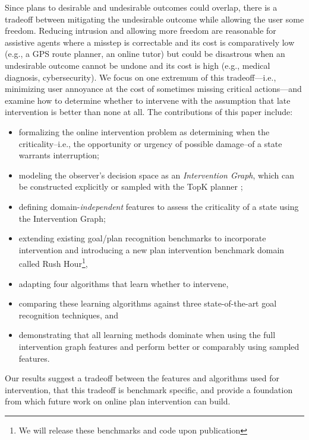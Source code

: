 \documentclass[letterpaper]{article}
\theoremstyle{plain}
\begin{document}
Since plans to desirable and undesirable outcomes could overlap, there is a tradeoff between mitigating the undesirable outcome while allowing the user some freedom.  
Reducing intrusion and allowing more freedom are reasonable for assistive agents where a misstep is correctable and its cost is comparatively low (e.g., a GPS route planner, an online tutor) but could be disastrous when an undesirable outcome cannot be undone and its cost is high (e.g., medical diagnosis, cybersecurity).  
We focus on one extremum of this tradeoff---i.e., minimizing user annoyance at the cost of sometimes missing critical actions---and examine how to determine whether to intervene with the assumption that late intervention is better than none at all.
The contributions of this paper include:
\begin{itemize}
\item formalizing the online intervention problem as determining when the criticality--i.e., the opportunity or urgency of possible damage--of a state warrants interruption; 
\item modeling the observer's decision space as an \emph{Intervention Graph}, which can be constructed explicitly or sampled with the TopK planner \cite{riabov2014};
\item defining domain-\emph{independent} features to assess the criticality of a state using the Intervention Graph;
\item extending existing goal/plan recognition benchmarks \cite{ramirez2009plan,ramirez2010probabilistic} to incorporate intervention and introducing a new plan intervention benchmark domain called Rush Hour\footnote{We will release these benchmarks and code upon publication}, 
\item adapting four algorithms that learn whether to intervene, 
\item comparing these learning algorithms against three state-of-the-art goal recognition techniques, and
\item demonstrating that all learning methods dominate when using the full intervention graph features and perform better or comparably using sampled features.
\end{itemize}
Our results suggest a tradeoff between the features and algorithms used for intervention, that this tradeoff is benchmark specific, and provide a foundation from which future work on online plan intervention can build.
\end{document}
